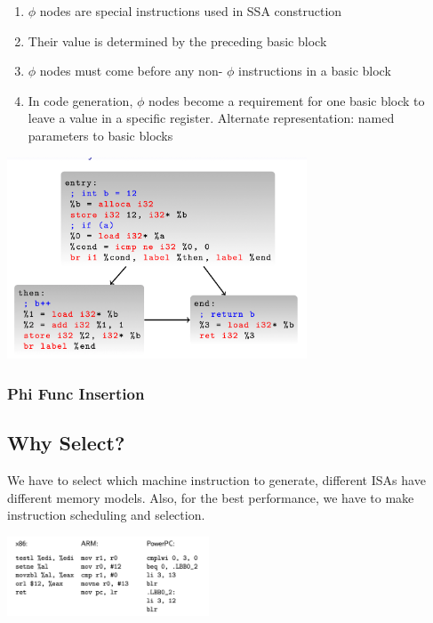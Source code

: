 \documentclass[a4paper]{exam}
\theoremstyle{definition}
\begin{document}
\begin{enumerate}
  \item  $\phi$ nodes are special instructions used in SSA construction
  \item Their value is determined by the preceding basic block
  \item $\phi$ nodes must come before any non- $\phi$ instructions in a basic
        block
  \item In code generation, $\phi$ nodes become a requirement for one
        basic block to leave a value in a specific register.
        Alternate representation: named parameters to basic blocks
\end{enumerate}
\begin{center}
  \includegraphics[height=6cm]{img/llvm_compiled_cfg.png}
\end{center}

\subsubsection{Phi Func Insertion}
\subsection{Why Select?}
We have to select which machine instruction to generate, different ISAs have different memory models. Also, for the best performance, we have to make instruction scheduling and selection.
\begin{center}
  \includegraphics[width=6cm]{img/llvm_arch_diff.png}
\end{center}
\end{document}
